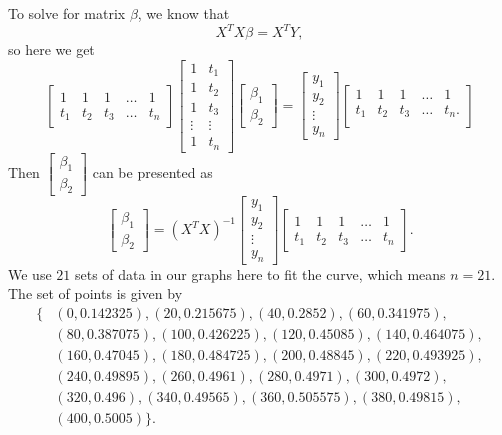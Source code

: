 \documentclass[11pt]{book}
\begin{document}
To solve for matrix $\beta$, we know that
\begin{equation}\label{best_fit}
X^TX\beta=X^TY,
\end{equation}
so here we get
$$
\begin{bmatrix}
    1&1&1&\dots&1\\
    t_1&t_2&t_3&\dots&t_n
\end{bmatrix}
\begin{bmatrix}
    1&t_1\\
    1&t_2\\
    1&t_3\\
    \vdots&\vdots\\
    1&t_n
\end{bmatrix}
\begin{bmatrix}
    \beta_1\\
    \beta_2
\end{bmatrix}
=\begin{bmatrix}
    y_1\\
    y_2\\
    \vdots\\
    y_n
\end{bmatrix}
\begin{bmatrix}
    1&1&1&\dots&1\\
    t_1&t_2&t_3&\dots&t_n. \\
\end{bmatrix}
$$
Then 
$
\begin{bmatrix}
\beta_1\\
\beta_2
\end{bmatrix}
$ can be presented as 
$$
\begin{bmatrix}
    \beta_1\\
    \beta_2
\end{bmatrix}
=(X^TX)^{-1}
\begin{bmatrix}
    y_1\\
    y_2\\
    \vdots\\
    y_n
\end{bmatrix}
\begin{bmatrix}
    1&1&1&\dots&1\\
    t_1&t_2&t_3&\dots&t_n
\end{bmatrix}.
$$
We use $21$ sets of data in our graphs here to fit the curve, which means $n=21$. The set of points is given by
\begin{align*}
\{ &(0, 0.142325), (20, 0.215675), (40, 0.2852), (60, 0.341975), \\
   &(80, 0.387075), (100, 0.426225), (120, 0.45085), (140, 0.464075), \\
   &(160, 0.47045), (180, 0.484725), (200, 0.48845), (220, 0.493925), \\
   &(240, 0.49895), (260, 0.4961), (280, 0.4971), (300, 0.4972), \\
   &(320, 0.496), (340, 0.49565), (360, 0.505575), (380, 0.49815), \\
   &(400, 0.5005) \}.
\end{align*}
\end{document}
